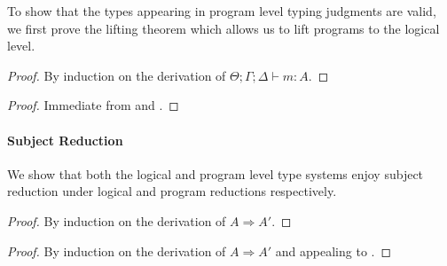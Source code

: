 To show that the types appearing in program level typing judgments are valid, 
we first prove the lifting theorem which allows us to lift programs to the logical level.

\begin{proof}
  By induction on the derivation of $\Theta ; \Gamma ; \Delta \vdash m : A$.
\end{proof}

\begin{proof}
  Immediate from  and .
\end{proof}

\paragraph{\textbf{Subject Reduction}}
We show that both the logical and program level type systems enjoy subject reduction
under logical and program reductions respectively.

\begin{proof}
  By induction on the derivation of $A \Rightarrow A'$.
\end{proof}

\begin{proof}
  By induction on the derivation of $A \Rightarrow A'$ and appealing to  
  .
\end{proof}

